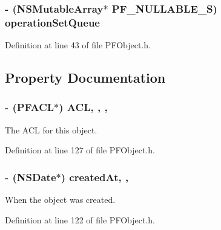 \subsubsection[{operation\+Set\+Queue}]{\setlength{\rightskip}{0pt plus 5cm}-\/ (N\+S\+Mutable\+Array$\ast$ {\bf P\+F\+\_\+\+N\+U\+L\+L\+A\+B\+L\+E\+\_\+\+S}) operation\+Set\+Queue\hspace{0.3cm}{\ttfamily [protected]}}\label{interface_p_f_object_acb2994f40fd392505e774a92f501c84c}


Definition at line 43 of file P\+F\+Object.\+h.



\subsection{Property Documentation}
\hypertarget{interface_p_f_object_ad09c7decbf32c9119852e30da0bf09a6}{}
\subsubsection[{A\+C\+L}]{\setlength{\rightskip}{0pt plus 5cm}-\/ ({\bf P\+F\+A\+C\+L}$\ast$) A\+C\+L\hspace{0.3cm}{\ttfamily [read]}, {\ttfamily [write]}, {\ttfamily [nonatomic]}, {\ttfamily [strong]}}\label{interface_p_f_object_ad09c7decbf32c9119852e30da0bf09a6}
The A\+C\+L for this object. 

Definition at line 127 of file P\+F\+Object.\+h.

\hypertarget{interface_p_f_object_ab9baa371bf6fc375e538dec6e95c4200}{}
\subsubsection[{created\+At}]{\setlength{\rightskip}{0pt plus 5cm}-\/ (N\+S\+Date$\ast$) created\+At\hspace{0.3cm}{\ttfamily [read]}, {\ttfamily [nonatomic]}, {\ttfamily [strong]}}\label{interface_p_f_object_ab9baa371bf6fc375e538dec6e95c4200}
When the object was created. 

Definition at line 122 of file P\+F\+Object.\+h.

\hypertarget{interface_p_f_object_ac957b8fb3842dcf264264c3f4af836f6}{}
